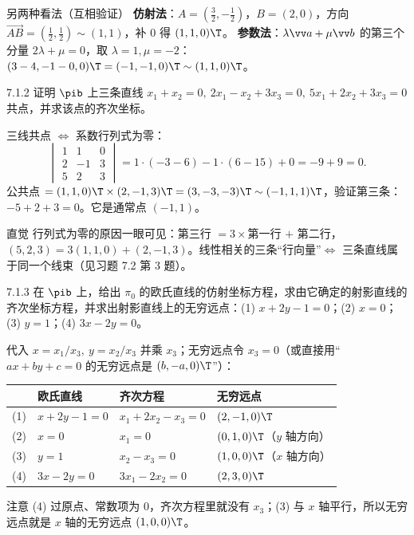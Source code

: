 \begin{ckbox}{另两种看法（互相验证）}
\textbf{仿射法}：$A=(\tfrac32,-\tfrac12)$，$B=(2,0)$，方向 $\overrightarrow{AB}=(\tfrac12,\tfrac12)\sim(1,1)$，补 0 得 $(1,1,0)\T$。\quad
\textbf{参数法}：$\lambda\vv a+\mu\vv b$ 的第三个分量 $2\lambda+\mu=0$，取 $\lambda=1,\mu=-2$：$(3-4,-1-0,0)\T=(-1,-1,0)\T\sim(1,1,0)\T$。
\end{ckbox}

\begin{ex}{7.1.2}
证明 $\pib$ 上三条直线 $x_1+x_2=0,\ 2x_1-x_2+3x_3=0,\ 5x_1+2x_2+3x_3=0$ 共点，并求该点的齐次坐标。
\end{ex}
\jie 三线共点 $\iff$ 系数行列式为零：
\[
\begin{vmatrix}1&1&0\\2&-1&3\\5&2&3\end{vmatrix}=1\cdot(-3-6)-1\cdot(6-15)+0=-9+9=0 .
\]
公共点 $=(1,1,0)\T\times(2,-1,3)\T=(3,-3,-3)\T\sim(-1,1,1)\T$，验证第三条：$-5+2+3=0$。它是通常点 $(-1,1)$。

\begin{intbox}{直觉}
行列式为零的原因一眼可见：第三行 $=3\times$第一行 $+$ 第二行，$(5,2,3)=3(1,1,0)+(2,-1,3)$。\gd 线性相关的三条“行向量”$\iff$ 三条直线属于同一个线束（见习题 7.2 第 3 题）。
\end{intbox}

\begin{ex}{7.1.3}
在 $\pib$ 上，给出 $\pi_0$ 的欧氏直线的仿射坐标方程，求由它确定的射影直线的齐次坐标方程，并求出射影直线上的无穷远点：(1) $x+2y-1=0$；(2) $x=0$；(3) $y=1$；(4) $3x-2y=0$。
\end{ex}
\jie 代入 $x=x_1/x_3,\ y=x_2/x_3$ 并乘 $x_3$；无穷远点令 $x_3=0$（或直接用“$ax+by+c=0$ 的无穷远点是 $(b,-a,0)\T$”）：
\begin{center}
\renewcommand{\arraystretch}{1.2}
\begin{tabular}{llll}
\toprule
& 欧氏直线 & 齐次方程 & 无穷远点\\\midrule
(1) & $x+2y-1=0$ & $x_1+2x_2-x_3=0$ & $(2,-1,0)\T$\\
(2) & $x=0$ & $x_1=0$ & $(0,1,0)\T$（$y$ 轴方向）\\
(3) & $y=1$ & $x_2-x_3=0$ & $(1,0,0)\T$（$x$ 轴方向）\\
(4) & $3x-2y=0$ & $3x_1-2x_2=0$ & $(2,3,0)\T$\\\bottomrule
\end{tabular}
\end{center}
注意 (4) 过原点、常数项为 0，齐次方程里就没有 $x_3$；(3) 与 $x$ 轴平行，所以无穷远点就是 $x$ 轴的无穷远点 $(1,0,0)\T$。

